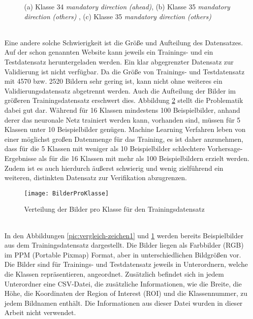 \begin{figure} [ht]
	\centering
	\subfloat[][]{\texttt{[image: 34]}}%
	\qquad
	\subfloat[][]{\texttt{[image: 35]}}%
	\qquad
	\subfloat[][]{\texttt{[image: 35-2]}}%
	\caption{(a) Klasse 34 \textit{mandatory direction (ahead)}, (b) Klasse 35 \textit{mandatory direction (others)} , (c) Klasse 35 \textit{mandatory direction (others)}}%
	\label{pic:vergleich-zeichen2}
\end{figure} \ \\
%
Eine andere solche Schwierigkeit ist die Größe und Aufteilung des Datensatzes. Auf der schon genannten Website kann jeweils ein Trainings- und ein Testdatensatz heruntergeladen werden. Ein klar abgegrenzter Datensatz zur Validierung ist nicht verfügbar. Da die Größe von Trainings- und Testdatensatz mit 4570 bzw. 2520 Bildern sehr gering ist, kann nicht ohne weiteres ein Validierungsdatensatz abgetrennt werden. Auch die Aufteilung der Bilder im größeren Trainingsdatensatz erschwert dies. Abbildung \ref{pic:picsproclass} stellt die Problematik dabei gut dar. Während für 16 Klassen mindestens 100 Beispielbilder, anhand derer das neuronale Netz trainiert werden kann, vorhanden sind, müssen für 5 Klassen unter 10 Beispielbilder genügen. Machine Learning Verfahren leben von einer möglichst großen Datenmenge für das Training, es ist daher anzunehmen, dass für die 5 Klassen mit weniger als 10 Beispielbilder schlechtere Vorhersage-Ergebnisse als für die 16 Klassen mit mehr als 100 Beispielbildern erzielt werden. Zudem ist es auch hierdurch äußerst schwierig und wenig zielführend ein weiteren, distinkten Datensatz zur Verifikation abzugrenzen. 

\begin{figure} [ht]
	\centering
	\texttt{[image: BilderProKlasse]}
	\caption{Verteilung der Bilder pro Klasse für den Trainingsdatensatz}
	\label{pic:picsproclass}
\end{figure} \ \\
%
In den Abbildungen \ref{pic:vergleich-zeichen1} und \ref{pic:vergleich-zeichen2} werden bereits Beispielbilder aus dem Trainingsdatensatz dargestellt. Die Bilder liegen als Farbbilder (RGB) im PPM (Portable Pixmap) Format, aber in unterschiedlichen Bildgrößen vor. Die Bilder sind für Trainings- und Testdatensatz jeweils in Unterordnern, welche die Klassen repräsentieren, angeordnet. Zusätzlich befindet sich in jedem Unterordner eine CSV-Datei, die zusätzliche Informationen, wie die Breite, die Höhe, die Koordinaten der Region of Interest (ROI) und die Klassennummer, zu jedem Bildnamen enthält. Die Informationen aus dieser Datei wurden in dieser Arbeit nicht verwendet. 

